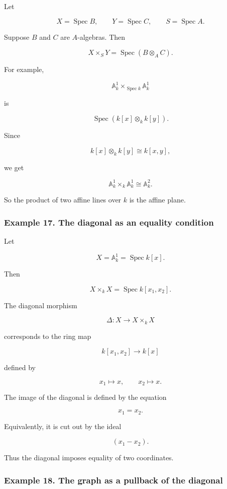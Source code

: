 \documentclass[12pt,a4paper]{article}
\theoremstyle{notespace}
\begin{document}
Let

\[
X=\operatorname{Spec}B,
\qquad
Y=\operatorname{Spec}C,
\qquad
S=\operatorname{Spec}A.
\]

Suppose \(B\) and \(C\) are \(A\)-algebras. Then

\[
X\times_S Y
=
\operatorname{Spec}(B\otimes_A C).
\]

For example,

\[
\mathbb{A}^1_k\times_{\operatorname{Spec}k}\mathbb{A}^1_k
\]

is

\[
\operatorname{Spec}(k[x]\otimes_k k[y]).
\]

Since

\[
k[x]\otimes_k k[y]\cong k[x,y],
\]

we get

\[
\mathbb{A}^1_k\times_k \mathbb{A}^1_k
\cong
\mathbb{A}^2_k.
\]

So the product of two affine lines over \(k\) is the affine plane.

\subsubsection{Example 17. The diagonal as an equality condition}

Let

\[
X=\mathbb{A}^1_k=\operatorname{Spec}k[x].
\]

Then

\[
X\times_k X=\operatorname{Spec}k[x_1,x_2].
\]

The diagonal morphism

\[
\Delta:X\to X\times_k X
\]

corresponds to the ring map

\[
k[x_1,x_2]\to k[x]
\]

defined by

\[
x_1\mapsto x,
\qquad
x_2\mapsto x.
\]

The image of the diagonal is defined by the equation

\[
x_1=x_2.
\]

Equivalently, it is cut out by the ideal

\[
(x_1-x_2).
\]

Thus the diagonal imposes equality of two coordinates.

\subsubsection{Example 18. The graph as a pullback of the diagonal}
\end{document}
